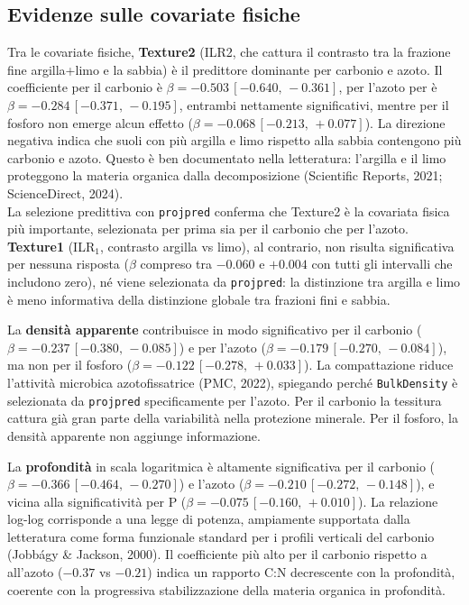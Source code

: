 \documentclass[11pt, a4paper]{article}
\begin{document}
\subsection{Evidenze sulle covariate fisiche}

Tra le covariate fisiche, \textbf{Texture2} (ILR2, che cattura il contrasto tra la frazione fine argilla+limo e la sabbia) è il predittore dominante per carbonio e azoto. Il coefficiente per il carbonio è $\beta = -0.503\,[ -0.640,\,-0.361 ]$, per l'azoto per  è $\beta = -0.284\,[ -0.371,\,-0.195 ]$, entrambi nettamente significativi, mentre per il fosforo non emerge alcun effetto ($\beta = -0.068\,[ -0.213,\,+0.077 ]$). La direzione negativa indica che suoli con più argilla e limo rispetto alla sabbia contengono più carbonio e azoto. Questo è ben documentato nella letteratura: l'argilla e il limo proteggono la materia organica dalla decomposizione (Scientific Reports, 2021; ScienceDirect, 2024). \\
La selezione predittiva con \texttt{projpred} conferma che Texture2 è la covariata fisica più importante, selezionata per prima sia per il carbonio che per l'azoto. \\
\textbf{Texture1} (ILR$_1$, contrasto argilla vs limo), al contrario, non risulta significativa per nessuna risposta ($\beta$ compreso tra $-0.060$ e $+0.004$ con tutti gli intervalli che includono zero), né viene selezionata da \texttt{projpred}: la distinzione tra argilla e limo è meno informativa della distinzione globale tra frazioni fini e sabbia.

La \textbf{densità apparente} contribuisce in modo significativo per il carbonio ($\beta = -0.237\,[ -0.380,\,-0.085 ]$) e per l'azoto ($\beta = -0.179\,[ -0.270,\,-0.084 ]$), ma non per il fosforo ($\beta = -0.122\,[ -0.278,\,+0.033 ]$). La compattazione riduce l'attività microbica azotofissatrice (PMC, 2022), spiegando perché \texttt{BulkDensity} è selezionata da \texttt{projpred} specificamente per l'azoto. Per il carbonio la tessitura cattura già gran parte della variabilità nella protezione minerale. Per il fosforo, la densità apparente non aggiunge informazione.

La \textbf{profondità} in scala logaritmica è altamente significativa per il carbonio  ($\beta = -0.366\,[ -0.464,\,-0.270 ]$) e l'azoto ($\beta = -0.210\,[ -0.272,\,-0.148 ]$), e vicina alla significatività per P ($\beta = -0.075\,[ -0.160,\,+0.010 ]$). La relazione log-log corrisponde a una legge di potenza, ampiamente supportata dalla letteratura come forma funzionale standard per i profili verticali del carbonio (Jobbágy \& Jackson, 2000). Il coefficiente più alto per il carbonio rispetto a all'azoto ($-0.37$ vs $-0.21$) indica un rapporto C:N decrescente con la profondità, coerente con la progressiva stabilizzazione della materia organica in profondità.
\end{document}
